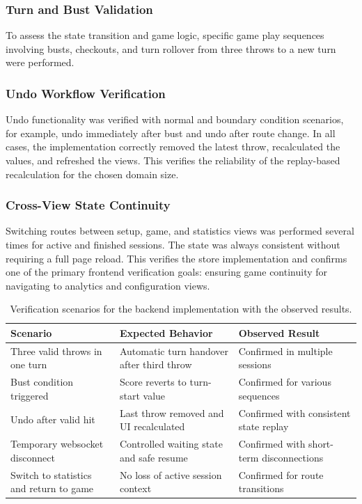 \subsubsection{Turn and Bust Validation}
To assess the state transition and game logic, specific game play sequences involving busts, checkouts, and turn rollover from three throws to a new turn were performed.

\subsubsection{Undo Workflow Verification}
Undo functionality was verified with normal and boundary condition scenarios, for example, undo immediately after bust and undo after route change. In all cases, the implementation correctly removed the latest throw, recalculated the values, and refreshed the views. This verifies the reliability of the replay-based recalculation for the chosen domain size.

\subsubsection{Cross-View State Continuity}
Switching routes between setup, game, and statistics views was performed several times for active and finished sessions. The state was always consistent without requiring a full page reload. This verifies the store implementation and confirms one of the primary frontend verification goals: ensuring game continuity for navigating to analytics and configuration views.

\begin{table}[H]
	\centering
	\begin{tabularx}{\linewidth}{@{}X X X@{}}
		\toprule
		\textbf{Scenario} & \textbf{Expected Behavior} & \textbf{Observed Result} \\
		\midrule
		Three valid throws in one turn & Automatic turn handover after third throw & Confirmed in multiple sessions \\
		Bust condition triggered & Score reverts to turn-start value & Confirmed for various sequences \\
		Undo after valid hit & Last throw removed and UI recalculated & Confirmed with consistent state replay \\
		Temporary websocket disconnect & Controlled waiting state and safe resume & Confirmed with short-term disconnections \\
		Switch to statistics and return to game & No loss of active session context & Confirmed for route transitions \\
		\bottomrule
	\end{tabularx}
\caption{Verification scenarios for the backend implementation with the observed results.}
\label{tab:backend_verification_scenarios}
\end{table}

